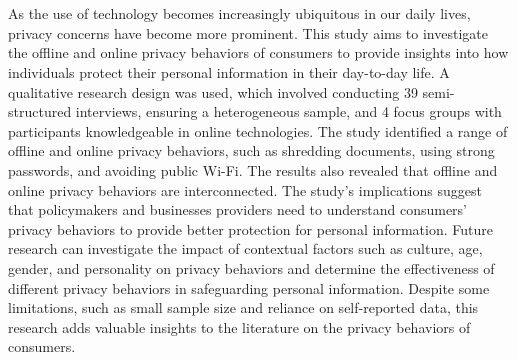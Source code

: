 \thispagestyle{empty}\section*{}

As the use of technology becomes increasingly ubiquitous in our daily lives,  privacy concerns have become more prominent. This study aims to investigate the offline and online privacy behaviors of consumers to provide insights into how individuals protect their personal information in their day-to-day life. A qualitative research design was used, which involved conducting 39 semi-structured interviews, ensuring a heterogeneous sample, and 4 focus groups with participants knowledgeable in online technologies. The study identified a range of offline and online privacy behaviors, such as shredding documents, using strong passwords, and avoiding public Wi-Fi. The results also revealed that offline and online privacy behaviors are interconnected. The study's implications suggest that policymakers and businesses providers need to understand consumers' privacy behaviors to provide better protection for personal information. Future research can investigate the impact of contextual factors such as culture, age, gender, and personality on privacy behaviors and determine the effectiveness of different privacy behaviors in safeguarding personal information. Despite some limitations, such as small sample size and reliance on self-reported data, this research adds valuable insights to the literature on the privacy behaviors of consumers.